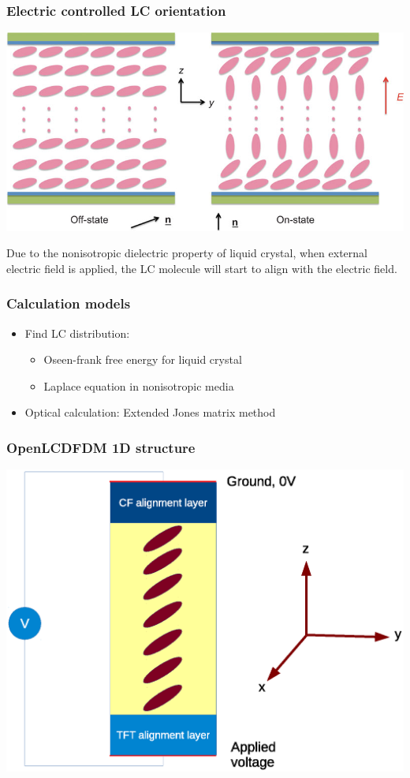 \documentclass{beamer}
\begin{document}
\begin{frame}
\frametitle{Electric controlled LC orientation}
\begin{center}
\includegraphics[scale=0.4]{ECB.jpg}
\end{center}
Due to the nonisotropic dielectric property of liquid crystal, when external electric field is applied, the LC molecule will start to align with the electric field.
\end{frame}
\begin{frame}
\frametitle{Calculation models}
\begin{itemize}
\item<1-> Find LC distribution:
\begin{itemize}
\item<1-> Oseen-frank free energy for liquid crystal
\item<1-> Laplace equation in nonisotropic media
\end{itemize}
\item<1-> Optical calculation: Extended Jones matrix method
\end{itemize}
\end{frame}
\begin{frame}
\frametitle{OpenLCDFDM 1D structure}
\begin{center}
\includegraphics[scale=0.4]{OneDimension_Coordinate.eps}
\end{center}
\end{frame}
\end{document}
